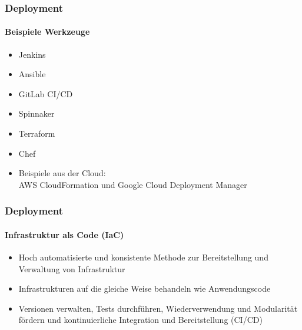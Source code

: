 \begin{frame}
  \frametitle{Deployment}
  \framesubtitle{Beispiele Werkzeuge}
  \begin{itemize}
    \item Jenkins
    \item Ansible
    \item GitLab CI/CD
    \item Spinnaker
    \item Terraform
    \item Chef
    \item Beispiele aus der Cloud:\\ AWS CloudFormation und Google Cloud Deployment Manager
  \end{itemize}
\end{frame}

\begin{frame}
  \frametitle{Deployment}
  \framesubtitle{Infrastruktur als Code (IaC) }
  \begin{itemize}
    \item Hoch automatisierte und konsistente Methode zur Bereitstellung und Verwaltung von Infrastruktur
    \item Infrastrukturen auf die gleiche Weise behandeln wie Anwendungscode
    \item Versionen verwalten, Tests durchführen, Wiederverwendung und Modularität fördern und kontinuierliche Integration und Bereitstellung (CI/CD) 
  \end{itemize}
\end{frame}


